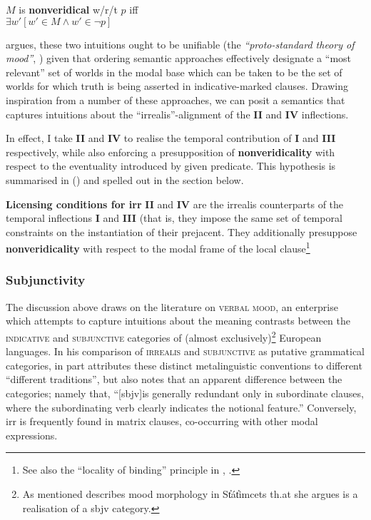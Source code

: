 \pex $ M $ is \textbf{nonveridical} w/r/t $ p $ iff\\
$ \exists w' [w'\in M\wedge w'\in\neg p]$
\xe

 \citet[71]{Portner2018a} argues, these two intuitions ought to be unifiable (the \textit{``proto-standard theory of mood''}, \citealp[see also][]{Portner2018,Portner2012}) given that ordering semantic approaches effectively designate a ``most relevant'' set of worlds in the modal base which can be taken to be the set of worlds for which truth is being asserted in indicative-marked clauses. Drawing inspiration from a number of these approaches, we can posit a semantics that captures intuitions about the ``irrealis''-alignment of the \textbf{II} and \textbf{IV} inflections.


In effect, I take \textbf{II} and \textbf{IV} to realise the temporal contribution of \textbf{I} and \textbf{III} respectively, while also enforcing a presupposition of \textbf{nonveridicality} with respect to the eventuality introduced by given predicate. This hypothesis is summarised in () and spelled out in the section below.

\pex\textbf{Licensing conditions for \gls{irr}}
\a \textbf{II} and \textbf{IV} are the irrealis counterparts of the temporal inflections \textbf{I} and \textbf{III} (that is, they impose the same set of temporal constraints on the instantiation of their prejacent.
\a They additionally presuppose \textbf{nonveridicality} with respect to the modal frame of the local clause\footnote{See also the ``locality of binding'' principle in  \citealp[201]{Percus2000}, 	\citealp[99]{Hacquard2010}.}
\xe



\subsubsection{Subjunctivity}


The discussion above draws on the literature on \textsc{verbal mood}, an enterprise which attempts to capture intuitions about the meaning contrasts between the \textsc{indicative} and \textsc{subjunctive} categories of (almost exclusively)\footnote{As mentioned \citet{Matthewson2010} describes mood morphology in St̓át̓imcets th.at she argues is a realisation of a \gls{sbjv} category.} European languages. In his comparison of \textsc{irrealis} and \textsc{subjunctive} as putative grammatical categories, \citet[186]{Palmer2001} in part attributes these distinct metalinguistic conventions to different ``different traditions'', but also notes that an apparent difference between the categories; namely that, ``[\gls{sbjv}]is generally redundant only in subordinate clauses, where the subordinating verb clearly indicates the notional feature.'' Conversely, \gls{irr} is frequently found in matrix clauses, co-occurring with other modal expressions.

